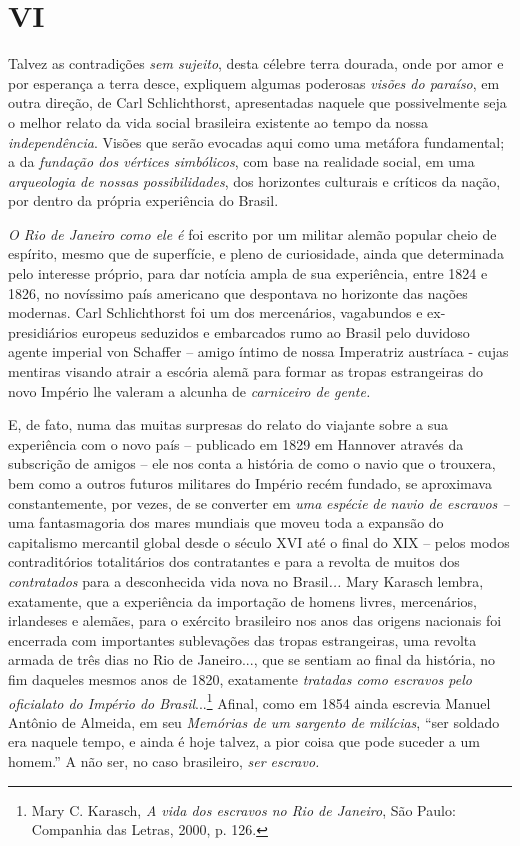 \section{VI}

Talvez as contradições \emph{sem sujeito}, desta célebre terra dourada,
onde por amor e por esperança a terra desce, expliquem algumas poderosas
\emph{visões do paraíso}, em outra direção, de Carl Schlichthorst,
apresentadas naquele que possivelmente seja o melhor relato da vida
social brasileira existente ao tempo da nossa \emph{independência}.
Visões que serão evocadas aqui como uma metáfora fundamental; a da
\emph{fundação dos vértices simbólicos}, com base na realidade social,
em uma \emph{arqueologia de nossas possibilidades}, dos horizontes
culturais e críticos da nação, por dentro da própria experiência do
Brasil.

\emph{O Rio de Janeiro como ele é} foi escrito por um militar alemão
popular cheio de espírito, mesmo que de superfície, e pleno de
curiosidade, ainda que determinada pelo interesse próprio, para dar
notícia ampla de sua experiência, entre 1824 e 1826, no novíssimo país
americano que despontava no horizonte das nações modernas. Carl
Schlichthorst foi um dos mercenários, vagabundos e ex-presidiários
europeus seduzidos e embarcados rumo ao Brasil pelo duvidoso agente
imperial von Schaffer -- amigo íntimo de nossa Imperatriz austríaca -
cujas mentiras visando atrair a escória alemã para formar as tropas
estrangeiras do novo Império lhe valeram a alcunha de \emph{carniceiro
de gente.}

E, de fato, numa das muitas surpresas do relato do viajante sobre a sua
experiência com o novo país -- publicado em 1829 em Hannover através da
subscrição de amigos -- ele nos conta a história de como o navio que o
trouxera, bem como a outros futuros militares do Império recém fundado,
se aproximava constantemente, por vezes, de se converter em \emph{uma}
\emph{espécie} \emph{de} \emph{navio de escravos --} uma fantasmagoria
dos mares mundiais que moveu toda a expansão do capitalismo mercantil
global desde o século XVI até o final do XIX -- pelos modos
contraditórios totalitários dos contratantes e para a revolta de muitos
dos \emph{contratados} para a desconhecida vida nova no Brasil\emph{...}
Mary Karasch lembra, exatamente, que a experiência da importação de
homens livres, mercenários, irlandeses e alemães, para o exército
brasileiro nos anos das origens nacionais foi encerrada com importantes
sublevações das tropas estrangeiras, uma revolta armada de três dias no
Rio de Janeiro..., que se sentiam ao final da história, no fim daqueles
mesmos anos de 1820, exatamente \emph{tratadas como escravos pelo
oficialato do Império do Brasil}...\footnote{Mary C. Karasch, \emph{A
  vida dos escravos no Rio de Janeiro}, São Paulo: Companhia das Letras,
  2000, p. 126.} Afinal, como em 1854 ainda escrevia Manuel Antônio de
Almeida, em seu \emph{Memórias de um sargento de milícias}, ``ser
soldado era naquele tempo, e ainda é hoje talvez, a pior coisa que pode
suceder a um homem.'' A não ser, no caso brasileiro, \emph{ser escravo.}

